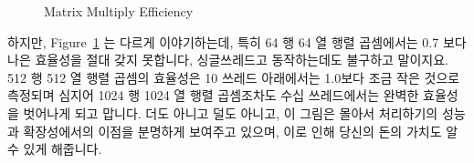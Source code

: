\begin{figure}[tbp]
\begin{center}
\end{center}
\caption{Matrix Multiply Efficiency}
\label{fig:SMPdesign:Matrix Multiply Efficiency}
\end{figure}

하지만,
Figure~\ref{fig:SMPdesign:Matrix Multiply Efficiency} 는 다르게 이야기하는데,
특히 64 행 64 열 행렬 곱셈에서는 0.7 보다 나은 효율성을 절대 갖지 못합니다,
싱글쓰레드고 동작하는데도 불구하고 말이지요.
512 행 512 열 행렬 곱셈의 효율성은 10 쓰레드 아래에서는 1.0보다 조금 작은
것으로 측정되며 심지어 1024 행 1024 열 행렬 곱셈조차도 수십 쓰레드에서는 완벽한
효율성을 벗어나게 되고 맙니다.
더도 아니고 덜도 아니고, 이 그림은 몰아서 처리하기의 성능과 확장성에서의 이점을
분명하게 보여주고 있으며, 이로 인해 당신의 돈의 가치도 알 수 있게 해줍니다.

